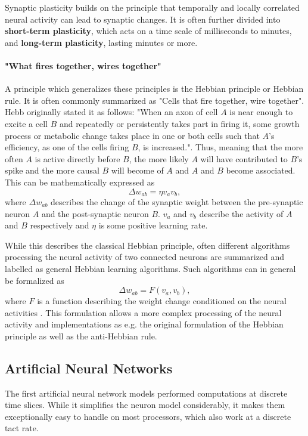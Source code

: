 Synaptic plasticity builds on the principle that temporally and locally correlated neural activity  can lead to synaptic changes.
It is often further divided into \textbf{short-term plasticity}, which acts on a time scale of milliseconds to minutes, and \textbf{long-term plasticity}, lasting minutes or more.


\paragraph{"What fires together, wires together"} \label{c:hebb}
A principle which generalizes these principles is the Hebbian principle or Hebbian rule.
It is often commonly summarized as "Cells that fire together, wire together".
Hebb originally stated it as follows: "When an axon of cell $A$ is near enough to excite a cell $B$ and repeatedly or persistently takes part in firing it, some growth process or metabolic change takes place in one or both cells such that $A$'s efficiency, as one of the cells firing $B$, is increased."\cite{hebb19680}.
Thus, meaning that the more often $A$ is active directly before $B$, the more likely $A$ will have contributed to $B$'s spike and the more causal $B$ will become of $A$ and $A$ and $B$ become associated.
This can be mathematically expressed as
\[
\Delta w_{ab} = \eta v_a v_b ,
\]
where $\Delta w_{ab}$ describes the change of the synaptic weight between the pre-synaptic neuron $A$ and the post-synaptic neuron $B$. 
$v_a$ and $v_b$ describe the activity of $A$ and $B$ respectively and $\eta$ is some positive learning rate. 

While this describes the classical Hebbian principle, often different algorithms processing the neural activity of two connected neurons are summarized and labelled as general Hebbian learning algorithms.
Such algorithms can in general be formalized as
\[
\Delta w_{ab} = F( v_a, v_b) , 
\]
where $F$ is a function describing the weight change conditioned on the neural activities \cite{gerstner2014neuronal}.     
This formulation allows a more complex processing of the neural activity and implementations as e.g. the original formulation of the Hebbian principle as well as the anti-Hebbian rule. 

\subsection{Artificial Neural Networks} \label{c:ann}

The first artificial neural network models performed computations at discrete time slices.
While it simplifies the neuron model considerably, it makes them exceptionally easy to handle on most processors, which also work at a discrete tact rate.

